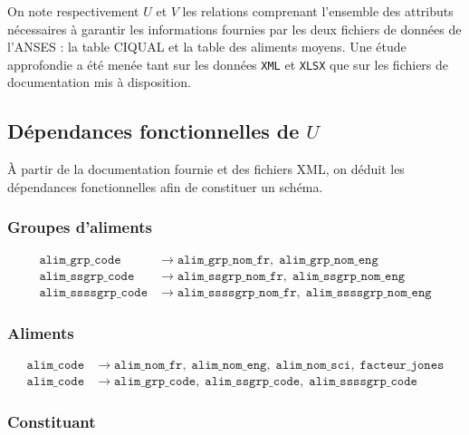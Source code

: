 \documentclass[12pt, a4paper]{article}
\newcommand{\attr}[1]{\texttt{#1}}
\begin{document}
    On note respectivement $U$ et $V$ les relations comprenant l'ensemble des attributs nécessaires à
    garantir les informations fournies par les deux fichiers de données de l'ANSES : la table CIQUAL
    et la table des aliments moyens. Une étude approfondie a été menée tant sur les données \texttt{XML}
    et \texttt{XLSX} que sur les fichiers de documentation mis à disposition.


    \subsection{Dépendances fonctionnelles de \texorpdfstring{$U$}{U}}

    À partir de la documentation fournie et des fichiers XML, on déduit les dépendances fonctionnelles
    afin de constituer un schéma.

    \subsubsection*{Groupes d'aliments}

    \begin{align*}
        \attr{alim\_grp\_code}     &\rightarrow \attr{alim\_grp\_nom\_fr},\; \attr{alim\_grp\_nom\_eng} \\
        \attr{alim\_ssgrp\_code}   &\rightarrow \attr{alim\_ssgrp\_nom\_fr},\; \attr{alim\_ssgrp\_nom\_eng} \\
        \attr{alim\_ssssgrp\_code} &\rightarrow \attr{alim\_ssssgrp\_nom\_fr},\; \attr{alim\_ssssgrp\_nom\_eng}
    \end{align*}

    \subsubsection*{Aliments}

    \begin{align*}
        \attr{alim\_code} &\rightarrow \attr{alim\_nom\_fr},\; \attr{alim\_nom\_eng},\; \attr{alim\_nom\_sci},\; \attr{facteur\_jones} \\
        \attr{alim\_code} &\rightarrow \attr{alim\_grp\_code},\; \attr{alim\_ssgrp\_code},\; \attr{alim\_ssssgrp\_code}
    \end{align*}

    \subsubsection*{Constituant}
\end{document}
